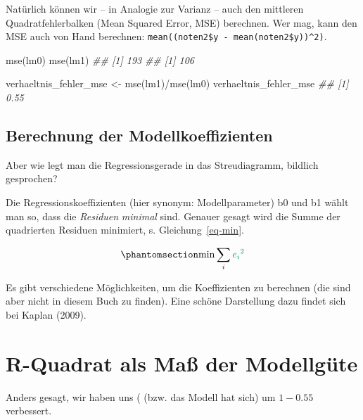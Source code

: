 \documentclass[
  letterpaper,
]{scrbook}
\newenvironment{Shaded}{\begin{snugshade}}{\end{snugshade}}
\newcommand{\DocumentationTok}[1]{\textcolor[rgb]{0.37,0.37,0.37}{\textit{#1}}}
\newcommand{\FunctionTok}[1]{\textcolor[rgb]{0.28,0.35,0.67}{#1}}
\newcommand{\NormalTok}[1]{\textcolor[rgb]{0.00,0.23,0.31}{#1}}
\newcommand{\OtherTok}[1]{\textcolor[rgb]{0.00,0.23,0.31}{#1}}
\newcommand{\SpecialCharTok}[1]{\textcolor[rgb]{0.37,0.37,0.37}{#1}}
\theoremstyle{definition}
\theoremstyle{definition}
\theoremstyle{definition}
\theoremstyle{remark}
\begin{document}
Natürlich können wir -- in Analogie zur Varianz -- auch den mittleren
Quadratfehlerbalken (Mean Squared Error, MSE) berechnen. Wer mag, kann
den MSE auch von Hand berechnen:
\texttt{mean((noten2\$y\ -\ mean(noten2\$y))\^{}2)}.

\begin{Shaded}
\begin{Highlighting}[]
\FunctionTok{mse}\NormalTok{(lm0)}
\FunctionTok{mse}\NormalTok{(lm1)}
\DocumentationTok{\#\# [1] 193}
\DocumentationTok{\#\# [1] 106}
\end{Highlighting}
\end{Shaded}

\begin{Shaded}
\begin{Highlighting}[]
\NormalTok{verhaeltnis\_fehler\_mse }\OtherTok{\textless{}{-}} \FunctionTok{mse}\NormalTok{(lm1)}\SpecialCharTok{/}\FunctionTok{mse}\NormalTok{(lm0)}
\NormalTok{verhaeltnis\_fehler\_mse}
\DocumentationTok{\#\# [1] 0.55}
\end{Highlighting}
\end{Shaded}

\subsection{Berechnung der
Modellkoeffizienten}\label{berechnung-der-modellkoeffizienten}

Aber wie legt man die Regressionsgerade in das Streudiagramm, bildlich
gesprochen?

Die Regressionskoeffizienten (hier synonym: Modellparameter) b0 und b1
wählt man so, dass die \emph{Residuen} \emph{minimal} sind. Genauer
gesagt wird die Summe der quadrierten {Residuen} minimiert, s.
Gleichung~\ref{eq-min}.

\begin{equation}\phantomsection\label{eq-min}{\text{min}\sum_i \color{errorcol}{e_i}^2}\end{equation}

Es gibt verschiedene Möglichkeiten, um die Koeffizienten zu berechnen
(die sind aber nicht in diesem Buch zu finden). Eine schöne Darstellung
dazu findet sich bei Kaplan (2009).

\section{R-Quadrat als Maß der
Modellgüte}\label{r-quadrat-als-mauxdf-der-modellguxfcte}

Anders gesagt, wir haben uns ( (bzw. das Modell hat sich) um
\(1 - 0.55\) verbessert.
\end{document}
